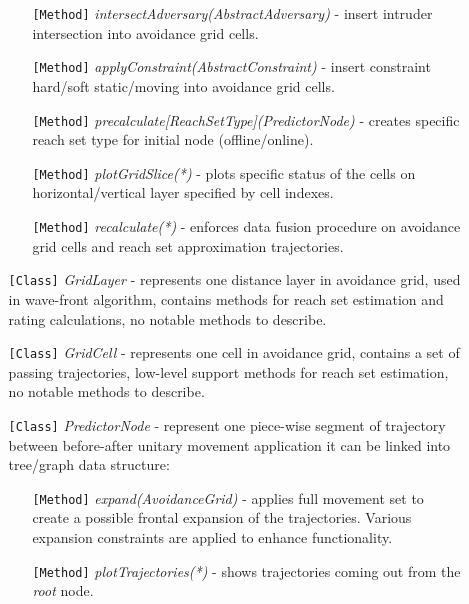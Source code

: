 \begin{itemize}
\begin{itemize}
\begin{itemize}
            \item[\texttt{[Method]}] \emph{intersectAdversary(AbstractAdversary)} - insert intruder intersection into avoidance grid cells.
            
            \item[\texttt{[Method]}] \emph{applyConstraint(AbstractConstraint)} - insert constraint hard/soft static/moving into avoidance grid cells.
            
            \item[\texttt{[Method]}] \emph{precalculate[ReachSetType](PredictorNode)} - creates specific reach set type for initial node (offline/online).
            
            \item[\texttt{[Method]}] \emph{plotGridSlice(*)} - plots specific status of the cells on horizontal/vertical layer specified by cell indexes.
            
            \item[\texttt{[Method]}] \emph{recalculate(*)} - enforces data fusion procedure on avoidance grid cells and reach set approximation trajectories.
        \end{itemize}
        
        \item[\texttt{[Class]}] \emph{GridLayer} - represents one distance layer in avoidance grid, used in wave-front algorithm, contains methods for reach set estimation and rating calculations, no notable methods to describe. 
        
        \item[\texttt{[Class]}] \emph{GridCell} - represents one cell in avoidance grid, contains a set of passing trajectories, low-level support methods for reach set estimation, no notable methods to describe.
        
        \item[\texttt{[Class]}] \emph{PredictorNode} - represent one piece-wise segment of trajectory between before-after unitary movement application it can be linked into tree/graph data structure:
        \begin{itemize}
                \item[\texttt{[Method]}] \emph{expand(AvoidanceGrid)} - applies full movement set to create a possible frontal expansion of the trajectories. Various expansion constraints are applied to enhance functionality. 
                
                \item[\texttt{[Method]}] \emph{plotTrajectories(*)} -  shows trajectories coming out from the \emph{root} node.
                

\end{itemize}
\end{itemize}
\end{itemize}
